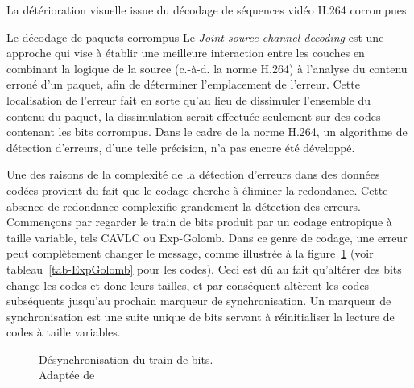 \documentclass[letterpaper, twoside, 12pt,memoire]{thETS}
\newcommand{\fig}[1]{figure~\ref{#1}}
\begin{document}
\begin{chapter}{La détérioration visuelle issue du décodage de séquences vidéo
H.264 corrompues}
\begin{section}{Le décodage de paquets corrompus}
Le \textit{Joint source-channel decoding} \citep{Duhamel2010} est une approche
qui vise à établir une meilleure interaction entre les couches en combinant la
logique de la source (c.-à-d. la norme H.264) à l'analyse du contenu erroné d'un
paquet, afin de déterminer l'emplacement de l'erreur. Cette localisation de l'erreur fait en
sorte qu'au lieu de dissimuler l'ensemble du contenu du paquet, la dissimulation
serait effectuée seulement sur des codes contenant les bits corrompus. Dans le
cadre de la norme H.264, un algorithme de détection d'erreurs, d'une telle
précision, n'a pas encore été développé.

Une des raisons de la complexité de la détection d'erreurs dans des données
codées provient du fait que le codage cherche à éliminer la redondance. Cette
absence de redondance complexifie grandement la détection des erreurs.
Commençons par regarder le train de bits produit par un codage entropique à
taille variable, tels CAVLC ou Exp-Golomb. Dans ce genre de codage, une erreur
peut complètement changer le message, comme illustrée à la \fig{fig-Desync}
(voir tableau~\ref{tab-ExpGolomb} pour les codes). Ceci est dû au fait
qu'altérer des bits change les codes et donc leurs tailles, et par conséquent
altèrent les codes subséquents jusqu'au prochain marqueur de synchronisation. Un
marqueur de synchronisation est une suite unique de bits servant à réinitialiser
la lecture de codes à taille variables.

\begin{figure}[htb]
\centering
{}
\caption{Désynchronisation du train de bits. \\
Adaptée de \citet[p.~11]{Ikuno2007}}
\label{fig-Desync}
\end{figure}


\end{section}
\end{chapter}
\end{document}
